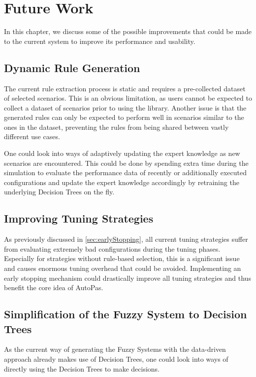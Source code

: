 \chapter{Future Work}
\label{sec:future_work}

In this chapter, we discuss some of the possible improvements that could be made to the current system to improve its performance and usability.

\section{Dynamic Rule Generation}

The current rule extraction process is static and requires a pre-collected dataset of selected scenarios. This is an obvious limitation, as users cannot be expected to collect a dataset of scenarios prior to using the library. Another issue is that the generated rules can only be expected to perform well in scenarios similar to the ones in the dataset, preventing the rules from being shared between vastly different use cases.

One could look into ways of adaptively updating the expert knowledge as new scenarios are encountered. This could be done by spending extra time during the simulation to evaluate the performance data of recently or additionally executed configurations and update the expert knowledge accordingly by retraining the underlying Decision Trees on the fly.

\section{Improving Tuning Strategies}

As previously discussed in \autoref{sec:earlyStopping}, all current tuning strategies suffer from evaluating extremely bad configurations during the tuning phases. Especially for strategies without rule-based selection, this is a significant issue and causes enormous tuning overhead that could be avoided. Implementing an early stopping mechanism could drastically improve all tuning strategies and thus benefit the core idea of AutoPas.

\section{Simplification of the Fuzzy System to Decision Trees}

As the current way of generating the Fuzzy Systems with the data-driven approach already makes use of Decision Trees, one could look into ways of directly using the Decision Trees to make decisions.

